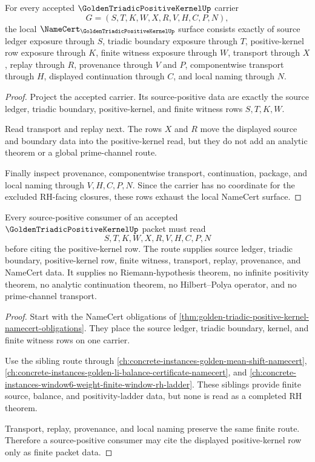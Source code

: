 \begin{theorem}
\label{thm:golden-triadic-positive-kernel-namecert-obligations}
For every accepted $\GoldenTriadicPositiveKernelUp$ carrier
$$
G=(S,T,K,W,X,R,V,H,C,P,N),
$$
the local $\NameCert_{\GoldenTriadicPositiveKernelUp}$ surface consists exactly of source ledger exposure through $S$, triadic boundary exposure through $T$, positive-kernel row exposure through $K$, finite witness exposure through $W$, transport through $X$, replay through $R$, provenance through $V$ and $P$, componentwise transport through $H$, displayed continuation through $C$, and local naming through $N$.
\end{theorem}
\begin{proof}
Project the accepted carrier. Its source-positive data are exactly the source ledger, triadic boundary, positive-kernel, and finite witness rows $S,T,K,W$.

Read transport and replay next. The rows $X$ and $R$ move the displayed source and boundary data into the positive-kernel read, but they do not add an analytic theorem or a global prime-channel route.

Finally inspect provenance, componentwise transport, continuation, package, and local naming through $V,H,C,P,N$. Since the carrier has no coordinate for the excluded RH-facing closures, these rows exhaust the local NameCert surface.
\end{proof}

\begin{theorem}
\label{thm:golden-triadic-positive-kernel-source-route}
Every source-positive consumer of an accepted $\GoldenTriadicPositiveKernelUp$ packet must read
$$
S,T,K,W,X,R,V,H,C,P,N
$$
before citing the positive-kernel row. The route supplies source ledger, triadic boundary, positive-kernel row, finite witness, transport, replay, provenance, and NameCert data. It supplies no Riemann-hypothesis theorem, no infinite positivity theorem, no analytic continuation theorem, no Hilbert--Polya operator, and no prime-channel transport.
\end{theorem}
\begin{proof}
Start with the NameCert obligations of \autoref{thm:golden-triadic-positive-kernel-namecert-obligations}. They place the source ledger, triadic boundary, kernel, and finite witness rows on one carrier.

Use the sibling route through \autoref{ch:concrete-instances-golden-mean-shift-namecert}, \autoref{ch:concrete-instances-golden-li-balance-certificate-namecert}, and \autoref{ch:concrete-instances-window6-weight-finite-window-rh-ladder}. These siblings provide finite source, balance, and positivity-ladder data, but none is read as a completed RH theorem.

Transport, replay, provenance, and local naming preserve the same finite route. Therefore a source-positive consumer may cite the displayed positive-kernel row only as finite packet data.
\end{proof}

